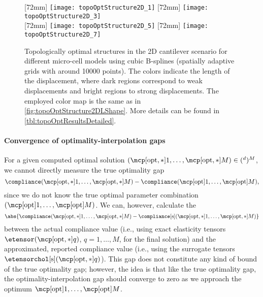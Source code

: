 \begin{figure}
  [72mm]{%
    \texttt{[image: topoOptStructure2D\_1]}%
  }%
  \hfill%
  [72mm]{%
    \texttt{[image: topoOptStructure2D\_3]}%
  }%
  \\[2mm]%
  [72mm]{%
    \texttt{[image: topoOptStructure2D\_5]}%
  }%
  \hfill%
  [72mm]{%
    \texttt{[image: topoOptStructure2D\_7]}%
  }%
  \caption[Optimal structures in the 2D cantilever scenario]{%
    Topologically optimal structures in the 2D cantilever scenario
    for different micro-cell models using cubic B-splines
    (spatially adaptive grids with around \num{10000} points).
    The colors indicate the length of the displacement,
    where dark regions correspond to weak displacements and
    bright regions to strong displacements.
    The employed color map is the same as in
    \cref{fig:topoOptStructure2DLShape}.
    More details can be found in \cref{tbl:topoOptResultsDetailed}.%
  }%
  \label{fig:topoOptStructure2DCantilever}%
\end{figure}

\paragraph{Convergence of optimality-interpolation gaps}

For a given computed optimal solution
$(\mcpoptappr{1}, \dotsc, \mcpoptappr{M}) \in (\real^d)^M$,
we cannot directly measure the true optimality gap
\begin{equation}
  \label{eq:topoOptOptimalityGapTrue}
  \compliance(\mcpoptappr{1}, \dotsc, \mcpoptappr{M}) -
  \compliance(\mcpopt{1}, \dotsc, \mcpopt{M}),
\end{equation}
since we do not know the true optimal parameter combination
$(\mcpopt{1}, \dotsc, \mcpopt{M})$.
We can, however, calculate the 
\begin{equation}
  \label{eq:topoOptOptimalityGapPseudo}
  \abs{
    \compliance(\mcpoptappr{1}, \dotsc, \mcpoptappr{M}) -
    \complianceintp(\mcpoptappr{1}, \dotsc, \mcpoptappr{M})
  }
\end{equation}
between the actual compliance value
(i.e., using exact elasticity tensors $\etensor(\mcpoptappr{q})$,
$q = 1, \dotsc, M$, for the final solution) and
the approximated, reported compliance value
(i.e., using the surrogate tensors $\etensorcholintp(\mcpoptappr{q})$).
This gap does not constitute any kind of bound of the true optimality gap;
however, the idea is that like the true optimality gap,
the optimality-interpolation gap should converge to zero as
we approach the optimum $\mcpopt{1}, \dotsc, \mcpopt{M}$.

